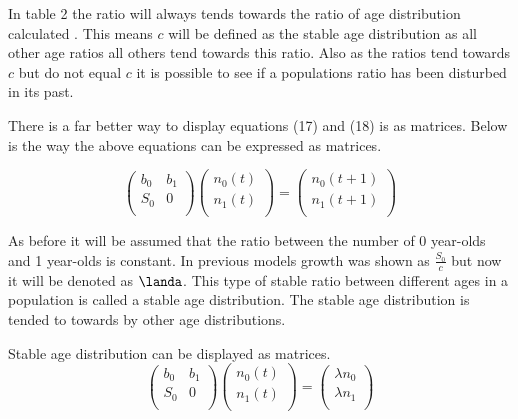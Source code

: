 \documentclass[final]{cmpreport}
\begin{document}
	In table 2 the ratio will always tends towards the ratio of age distribution calculated . This means $c$ will be defined as the stable age distribution as all other age ratios all others tend towards this ratio. Also as the ratios tend towards $c$ but do not equal $c$ it is possible to see if a populations ratio has been disturbed in its past. 
								
	There is a far better way to display equations  (17) and (18) is as matrices. Below is the way the above equations can be expressed as matrices.
	
	\begin{equation}
	\begin{pmatrix} 
	b_0 & b_1 \\ 
	S_0 & 0  \\ 
	\end{pmatrix}  \begin{pmatrix} 
	n_0(t) \\ 
	n_1(t) \\ 
	\end{pmatrix} = \begin{pmatrix} 
	n_0(t+1) \\ 
	n_1(t+1) \\ 
	\end{pmatrix}
	 \end{equation}
	
	As before it will be assumed that the ratio between the number of 0 year-olds and 1 year-olds is constant. In previous models growth was shown as $\frac{S_0}{c} $ but now it will be denoted as $\landa$. This type of stable ratio between different ages in a population is called a stable age distribution. The stable age distribution is tended to towards by other age distributions.
	
	Stable age distribution can be displayed as matrices. 
	\begin{equation}
		\begin{pmatrix} 
		b_0 & b_1 \\ 
		S_0 & 0  \\ 
		\end{pmatrix}  \begin{pmatrix} 
		n_0(t) \\ 
		n_1(t) \\ 
		\end{pmatrix} = \begin{pmatrix} 
		\lambda n_0 \\ 
		\lambda n_1 \\ 
		\end{pmatrix}
	\end{equation}
	
\end{document}
